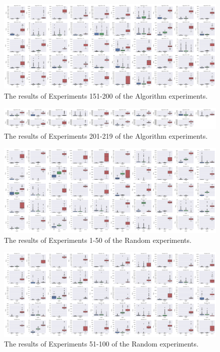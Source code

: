 \documentclass[12pt]{article}
\begin{document}
\begin{figure}[htbp]
\includegraphics[width=1\linewidth]{Algorithm150-199.png} 
\caption{The results of Experiments 151-200 of the Algorithm experiments.}
\end{figure} 

\begin{figure}[htbp]
\includegraphics[width=1\linewidth]{Algorithm200-218.png} 
\caption{The results of Experiments 201-219 of the Algorithm experiments.}
\end{figure} 

\begin{figure}[htbp]
\includegraphics[width=1\linewidth]{Random0-49.png} 
\caption{The results of Experiments 1-50 of the Random experiments.}
\end{figure} 

\begin{figure}[htbp]
\includegraphics[width=1\linewidth]{Random50-99.png} 
\caption{The results of Experiments 51-100 of the Random experiments.}
\end{figure} 
\end{document}
